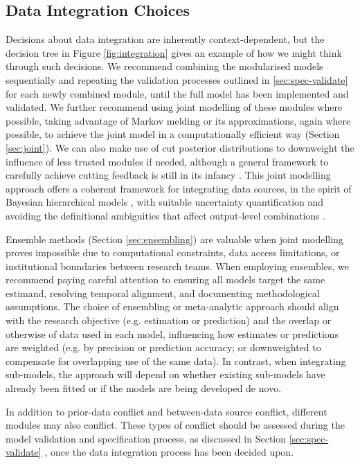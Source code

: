 \documentclass{article}
\begin{document}
\subsection{Data Integration Choices}\label{sec:integration}

Decisions about data integration are inherently context-dependent, but the decision tree in Figure \ref{fig:integration} gives an example of how we might think through such decisions. We recommend combining the modularised models sequentially and repeating the validation processes outlined in \ref{sec:spec-validate} for each newly combined module, until the full model has been implemented and validated.
We further recommend using joint modelling of these modules where possible, taking advantage of Markov melding \citep{goudie2019joining} or its approximations, again where possible, to achieve the joint model in a computationally efficient way (Section \ref{sec:joint}). We can also make use of cut posterior distributions \citep{plummer2015cuts} to downweight the influence of less trusted modules if needed, although a general framework to carefully achieve cutting feedback is still in its infancy \citep{liu2025general}. 
This joint modelling approach offers a coherent framework for integrating data sources, in the spirit of Bayesian hierarchical models \citep{gelman2020bayesian,deangelis2018analysing}, with suitable uncertainty quantification and avoiding the definitional ambiguities that affect output-level combinations \citep{manley2024combining, brockhaus2023why}. 

Ensemble methods (Section \ref{sec:ensembling}) are valuable when joint modelling proves impossible due to computational constraints, data access limitations, or institutional boundaries between research teams.
When employing ensembles, we recommend paying careful attention to ensuring all models target the same estimand, resolving temporal alignment, and documenting methodological assumptions. The choice of ensembling or meta-analytic approach should align with the research objective (e.g. estimation or prediction) and the overlap or otherwise of data used in each model, influencing how estimates or predictions are weighted (e.g. by precision or prediction accuracy; or downweighted to compensate for overlapping use of the same data). In contrast, when integrating sub-models, the approach will depend on whether existing sub-models have already been fitted or if the models are being developed de novo.

In addition to prior-data conflict and between-data source conflict, different modules may also conflict. These types of conflict should be assessed during the model validation and specification process, as discussed in Section \ref{sec:spec-validate} \citep{presanis2013conflict,sherratt2021exploring,yang2025detecting}, once the data integration process has been decided upon.
\end{document}
